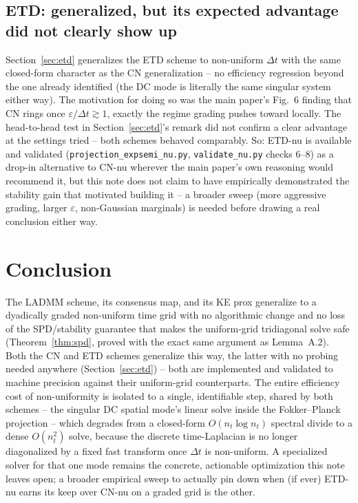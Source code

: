 \documentclass[11pt]{article}
\newcommand{\eps}{\varepsilon}
\newcommand{\dt}{\Delta t}
\newcommand{\code}[1]{\texttt{#1}}
\begin{document}
\subsection{ETD: generalized, but its expected advantage did not clearly show up}
Section~\ref{sec:etd} generalizes the ETD scheme to non-uniform $\dt$ with the same closed-form
character as the CN generalization -- no efficiency regression beyond the one already identified
(the DC mode is literally the same singular system either way). The motivation for doing so was
the main paper's Fig.~6 finding that CN rings once $\eps/\dt\gtrsim1$, exactly the regime grading
pushes toward locally. The head-to-head test in Section~\ref{sec:etd}'s remark did not confirm a
clear advantage at the settings tried -- both schemes behaved comparably. So: ETD-nu is available
and validated (\code{projection\_expsemi\_nu.py}, \code{validate\_nu.py} checks 6--8) as a
drop-in alternative to CN-nu wherever the main paper's own reasoning would recommend it, but this
note does not claim to have empirically demonstrated the stability gain that motivated building
it -- a broader sweep (more aggressive grading, larger $\eps$, non-Gaussian marginals) is needed
before drawing a real conclusion either way.

\section{Conclusion}

The LADMM scheme, its consensus map, and its KE prox generalize to a dyadically graded
non-uniform time grid with no algorithmic change and no loss of the SPD/stability guarantee that
makes the uniform-grid tridiagonal solve safe (Theorem~\ref{thm:spd}, proved with the exact same
argument as Lemma~A.2). Both the CN and ETD schemes generalize this way, the latter with no
probing needed anywhere (Section~\ref{sec:etd}) -- both are implemented and validated to machine
precision against their uniform-grid counterparts. The entire efficiency cost of non-uniformity
is isolated to a single, identifiable step, shared by both schemes -- the singular DC spatial
mode's linear solve inside the Fokker--Planck projection -- which degrades from a closed-form
$O(n_t\log n_t)$ spectral divide to a dense $O(n_t^2)$ solve, because the discrete time-Laplacian
is no longer diagonalized by a fixed fast transform once $\dt$ is non-uniform. A specialized
solver for that one mode remains the concrete, actionable optimization this note leaves open; a
broader empirical sweep to actually pin down when (if ever) ETD-nu earns its keep over CN-nu on a
graded grid is the other.
\end{document}
